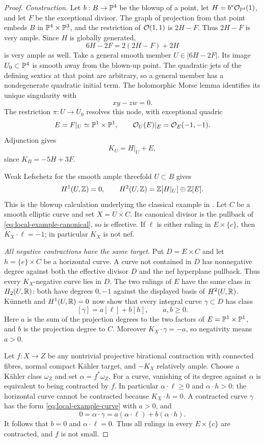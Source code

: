 \begin{proof}
\emph{Construction.}
Let $b:B\to\mathbb P^4$ be the blowup of a point, let
$H=b^*\mathcal O_{\mathbb P^4}(1)$, and let $F$ be the exceptional divisor.
The graph of projection from that point embeds $B$ in
$\mathbb P^4\times\mathbb P^3$, and the restriction of $\mathcal O(1,1)$ is $2H-F$.
Thus $2H-F$ is very ample.  Since $H$ is globally generated,
\[
 6H-2F=2(2H-F)+2H
\]
is very ample as well.  Take a general smooth member
$U\in|6H-2F|$.
Its image $U_0\subset\mathbb P^4$ is smooth away from the blown-up point.
The quadratic jets of the defining sextics at that point are arbitrary,
so a general member has a nondegenerate quadratic initial term.
The holomorphic Morse lemma identifies its unique singularity with
\[
 xy-zw=0.
\]
The restriction $\pi:U\to U_0$ resolves this node, with exceptional
quadric
\[
 E=F|_U\simeq\mathbb P^1\times\mathbb P^1,
 \qquad \mathcal O_U(E)|_E=\mathcal O_E(-1,-1).
\]
Adjunction gives
\begin{equation}\label{eq:local-example-canonical}
 K_U=H|_U+E,
\end{equation}
since $K_B=-5H+3F$.

Weak Lefschetz for the smooth ample threefold $U\subset B$ gives
\[
 H^1(U,\mathbb Z)=0,
 \qquad H^2(U,\mathbb Z)=\mathbb Z[H|_U]\oplus\mathbb Z[E].
\]
This is the blowup calculation underlying the classical example in
\cite[Definition~5.1, Remark~(b)]{Reid}.
Let $C$ be a smooth elliptic curve and set $X=U\times C$.
Its canonical divisor is the pullback of \eqref{eq:local-example-canonical},
so is effective.  If $\ell$ is either ruling in $E\times\{c\}$, then
$K_X\cdot\ell=-1$; in particular $K_X$ is not nef.

\emph{All negative contractions have the same target.}
Put $D=E\times C$ and let $h=\{e\}\times C$ be a horizontal curve.
A curve not contained in $D$ has nonnegative degree against both the
effective divisor $D$ and the nef hyperplane pullback.  Thus every
$K_X$-negative curve lies in $D$.
The two rulings of $E$ have the same class in $H_2(U,\mathbb R)$: both have degrees
$0,-1$ against the displayed basis of $H^2(U,\mathbb R)$.
Künneth and $H^1(U,\mathbb R)=0$ now show that every integral curve
$\gamma\subset D$ has class
\begin{equation}\label{eq:local-example-curve}
 [\gamma]=a[\ell]+b[h],\qquad a,b\geq0.
\end{equation}
Here $a$ is the sum of the projection degrees to the two factors of
$E=\mathbb P^1\times\mathbb P^1$, and $b$ is the projection degree to $C$.
Moreover $K_X\cdot\gamma=-a$, so negativity means $a>0$.

Let $f:X\to Z$ be any nontrivial projective birational contraction with
connected fibres, normal compact Kähler target, and $-K_X$ relatively
ample.  Choose a Kähler class $\omega_Z$ and set $\alpha=f^*\omega_Z$.
For a curve, vanishing of its degree against $\alpha$ is equivalent to
being contracted by $f$.
In particular $\alpha\cdot\ell\geq0$ and $\alpha\cdot h>0$: the
horizontal curve cannot be contracted because $K_X\cdot h=0$.
A contracted curve $\gamma$ has the form
\eqref{eq:local-example-curve} with $a>0$, and
\[
 0=\alpha\cdot\gamma
   =a(\alpha\cdot\ell)+b(\alpha\cdot h).
\]
It follows that $b=0$ and $\alpha\cdot\ell=0$.
Thus all rulings in every $E\times\{c\}$ are contracted, and $f$ is not
small.


\end{proof}
